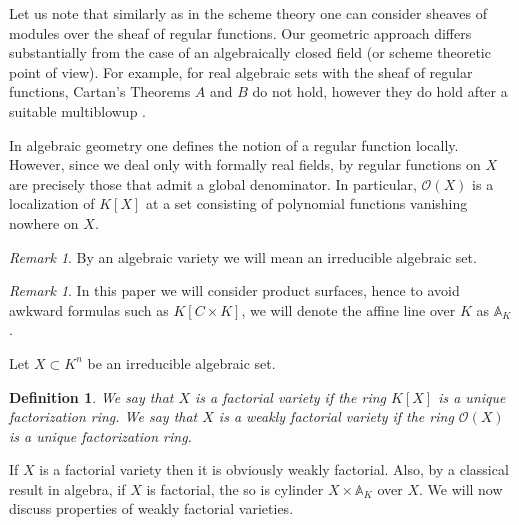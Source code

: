 \documentclass[12pt,reqno]{amsart}   	%
\newtheorem{df}[thm]{Definition}
\newtheorem{ex}[thm]{Example}
\theoremstyle{obs}
\theoremstyle{prob}
\theoremstyle{conj}
\theoremstyle{remark}
\newtheorem{remark}[thm]{Remark}
\newcommand{\OO}{\mathcal{O}}
\begin{document}
Let us note that similarly as in the scheme theory one can consider sheaves of modules over the sheaf of regular functions. Our geometric approach differs substantially from the case of an algebraically closed field (or scheme theoretic point of view). For example, for real algebraic sets with the sheaf of regular functions, Cartan's Theorems $A$ and $B$ do not hold, however they do hold after a suitable multiblowup \cite{kowalczyk2018, kowalczyk2019}.  


In algebraic geometry one defines the notion of a regular function locally. However, since we deal only with formally real fields, by \cite[Proposition 3.2.3]{bcr1998} regular functions on $X$ are precisely those that admit a global denominator. In particular, $\OO(X)$ is a localization of $K[X]$ at a set consisting of polynomial functions vanishing nowhere on $X$.



\begin{remark}
By an algebraic variety we will mean an irreducible algebraic set.
\end{remark}

\begin{remark}
In this paper we will consider product surfaces, hence to avoid awkward formulas such as $K[C\times K]$, we will denote the affine line over $K$ as $\mathbb{A}_K$.
 \end{remark}


Let $X \subset K^n$ be an irreducible algebraic set.

\begin{df}
We say that $X$ is a factorial variety if the ring $K[X]$ is a unique factorization ring. 
We say that $X$ is a weakly factorial variety if the ring $\OO(X)$ is a unique factorization ring.
\end{df}

If $X$ is a factorial variety then it is obviously weakly factorial. Also, by a classical result in algebra, if $X$ is factorial, the so is cylinder $X\times \mathbb{A}_K$ over $X$. We will now discuss properties of weakly factorial varieties.
\end{document}
